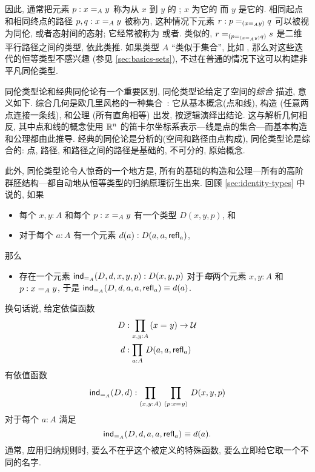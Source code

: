 因此, 通常把元素 $p : \id[A]{x}{y}$ 称为从 $x$ 到 $y$ 的 ;
%
$x$ 为它的%
%
%
而 $y$ 是它的.
%
%
相同起点和相同终点的路径 $p,q : \id[A]{x}{y}$ 被称为,
%
%
这种情况下元素 $r : \id[{(\id[A]{x}{y})}]{p}{q}$ 可以被视为同伦, 或者态射间的态射;
它经常被称为
%
%
或者.
%
%
%
类似的, $\id[{(\id[{(\id[A]{x}{y})}]{p}{q})}]{r}{s}$ 是二维平行路径之间的类型,
%
依此类推.
如果类型 $A$ ``类似于集合'', 比如 \nat, 那么对这些迭代的恒等类型不感兴趣 (参见 \cref{sec:basics-sets}), 不过在普通的情况下这可以构建非平凡同伦类型.


同伦类型论和经典同伦论有一个重要区别, 同伦类型论给定了空间的\emph{综合}%
%
%
%
描述, 意义如下.
综合几何是欧几里风格的一种集合~\cite{Euclid}: 它从基本概念(点和线), 构造 (任意两点连接一条线), 和公理 (所有直角相等) 出发, 按逻辑演绎出结论.
这与解析几何相反,
%
其中点和线的概念使用 $\R^n$ 的笛卡尔坐标系表示---线是点的集合---而基本构造和公理都由此推导.
经典的同伦论是分析的(空间和路径由点构成), 同伦类型论是综合的: 点, 路径, 和路径之间的路径是基础的, 不可分的, 原始概念.

此外, 同伦类型论令人惊奇的一个地方是, 所有的基础的构造和公理---所有的高阶群胚结构---都自动地从恒等类型的归纳原理衍生出来.
回顾 \cref{sec:identity-types} 中说的, 如果
\begin{itemize}
    \item 每个 $x,y:A$ 和每个 $p:\id[A]xy$ 有一个类型 $D(x,y,p)$, 和
    \item 对于每个 $a:A$ 有一个元素 $d(a):D(a,a,\refl a)$,
\end{itemize}
那么
\begin{itemize}
    \item 存在一个元素 $\indid{A}(D,d,x,y,p):D(x,y,p)$ 对于\emph{每}两个元素 $x,y:A$ 和 $p:\id[A]xy$, 于是 $\indid{A}(D,d,a,a,\refl a) \jdeq d(a)$.
\end{itemize}
换句话说, 给定依值函数
\begin{align*}
    D &:\prd{x,y:A} (\id{x}{y}) \to \type\\
    d &:\prd{a:A} D(a,a,\refl{a})
\end{align*}
有依值函数
\[
    \indid{A}(D,d):\prd{x,y:A}{p:\id{x}{y}} D(x,y,p)
\]
对于每个 $a:A$ 满足
\begin{equation}
    \label{eq:Jconv}
    \indid{A}(D,d,a,a,\refl{a})\jdeq d(a).
\end{equation}
通常, 应用归纳规则时, 要么不在乎这个被定义的特殊函数, 要么立即给它取一个不同的名字.

